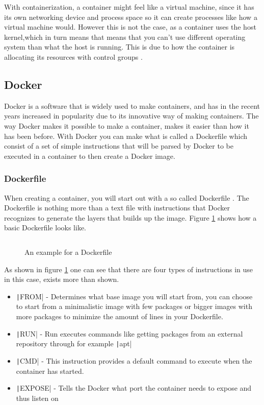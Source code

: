 \documentclass[../main.tex]{subfiles}
\begin{document}
\noindent With containerization, a container might feel like a virtual machine, since it has its own networking device and process space so it can create processes like how a virtual machine would. 
However this is not the case, as a container uses the host kernel,which in turn means that means that you can't use different operating system than what the host is running. This is due to how the container is allocating its resources with control groups \cite{cgroup}. 

\subsection{Docker}
Docker is a software that is widely used to make containers, and has in the recent years increased in popularity due to its innovative way of making containers. The way Docker makes it possible to make a container, makes it easier than how it has been before. With Docker you can make what is called a Dockerfile which consist of a set of simple instructions that will be parsed by Docker to be executed in a container to then create a Docker image.

\pagebreak\subsubsection*{Dockerfile}
When creating a container, you will start out with a so called Dockerfile \cite{dockerfile}. The Dockerfile is nothing more than a text file with instructions that Docker recognizes to generate the layers that builds up the image. Figure \ref{fig:Dockerfile} shows how a basic Dockerfile looks like.

\begin{figure}[H]
    \inputminted[linenos]{vim}{code/Dockerfile}
    \caption{An example for a Dockerfile}
    \label{fig:Dockerfile}
\end{figure}

As shown in figure \ref{fig:Dockerfile} one can see that there are four types of instructions\cite{dockerfile} in use in this case, exists more than shown.
\begin{itemize}
    \item \texttt|FROM| - Determines what base image you will start from, you can choose to start from a minimalistic image with few packages or bigger images with more packages to minimize the amount of lines in your Dockerfile.
    \item \texttt|RUN| - Run executes commands like getting packages from an external repository through for example \texttt|apt|
    \item \texttt|CMD| - This instruction provides a default command to execute when the container has started.
    \item \texttt|EXPOSE| - Tells the Docker what port the container needs to expose and thus listen on
\end{itemize}
\end{document}
